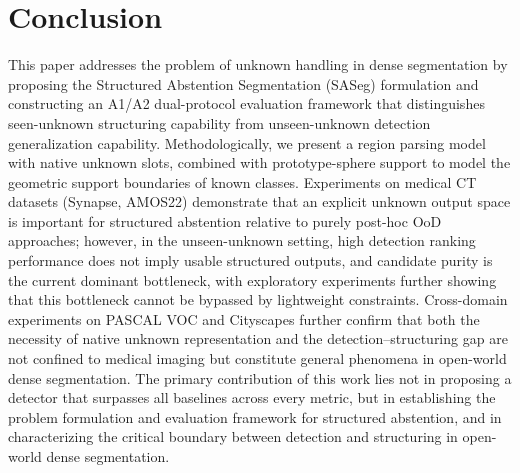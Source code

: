 \documentclass[3p,twocolumn,authoryear]{elsarticle}
\begin{document}
\section{Conclusion}\label{sec:conclusion}
This paper addresses the problem of unknown handling in dense segmentation
by proposing the Structured Abstention Segmentation (SASeg) formulation and constructing
an A1/A2 dual-protocol evaluation framework that distinguishes seen-unknown structuring
capability from unseen-unknown detection generalization capability.
Methodologically, we present a region parsing model with native unknown slots, combined
with prototype-sphere support to model the geometric support boundaries of known classes.
Experiments on medical CT datasets (Synapse, AMOS22) demonstrate that an explicit
unknown output space is important for structured abstention relative to purely post-hoc
OoD approaches; however, in the unseen-unknown setting, high detection ranking performance
does not imply usable structured outputs, and candidate purity is the current dominant
bottleneck, with exploratory experiments further showing that this bottleneck cannot be
bypassed by lightweight constraints.
Cross-domain experiments on PASCAL VOC and Cityscapes further confirm that both the
necessity of native unknown representation and the detection--structuring gap are not
confined to medical imaging but constitute general phenomena in open-world dense
segmentation.
The primary contribution of this work lies not in proposing a detector that surpasses
all baselines across every metric, but in establishing the problem formulation and
evaluation framework for structured abstention, and in characterizing the critical
boundary between detection and structuring in open-world dense segmentation.



\end{document}
